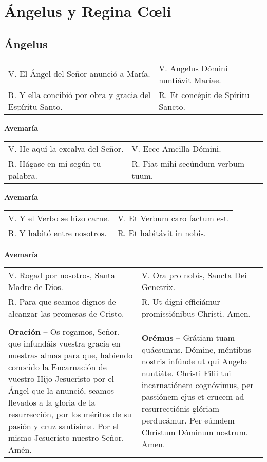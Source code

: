 


\chapter*{Ángelus y Regina Cœli}

\section*{Ángelus}

\begin{longtable} { p{} p{} }
    V. El Ángel del Señor anunció a María.                   & V. Angelus Dómini nuntiávit Maríae. \\
    R. Y ella concibió por obra y gracia del Espíritu Santo. & R. Et concépit de Spíritu Sancto.
\end{longtable}

\begin{center}
    \textbf{Avemaría}
\end{center}

\begin{longtable} { p{} p{} }
    V. He aquí la excalva del Señor.  & V. Ecce Amcilla Dómini.            \\
    R. Hágase en mi según tu palabra. & R. Fiat mihi secúndum verbum tuum.
\end{longtable}

\begin{center}
    \textbf{Avemaría}
\end{center}

\begin{longtable} { p{} p{} }
    V. Y el Verbo se hizo carne. & V. Et Verbum caro factum est. \\
    R. Y habitó entre nosotros.  & R. Et habitávit in nobis.
\end{longtable}

\begin{center}
    \textbf{Avemaría}
\end{center}

\begin{longtable} { p{} p{} }
    V. Rogad por nosotros, Santa Madre de Dios.                   & V. Ora pro nobis, Sancta Dei Genetrix.               \\
    R. Para que seamos dignos de alcanzar las promesas de Cristo. & R. Ut digni efficiámur promissiónibus Christi. Amen. \\\\
    \textbf{Oración} -- Os rogamos, Señor, que infundáis vuestra gracia en nuestras almas para que,
    habiendo conocido la Encarnación de vuestro Hijo Jesucristo por el Ángel que la anunció,
    seamos llevados a la gloria de la resurrección, por los méritos de su pasión y cruz santísima.
    Por el mismo Jesucristo nuestro Señor. Amén.                  &
    \textbf{Orémus} -- Grátiam tuam quáesumus. Dómine, méntibus nostris infúnde ut qui Angelo nuntiáte.
    Christi Filii tui incarnatiónem cognóvimus, per passiónem ejus et crucem ad resurrectiónis glóriam perducámur.
    Per eúmdem Christum Dóminum nostrum. Amen.
\end{longtable}

